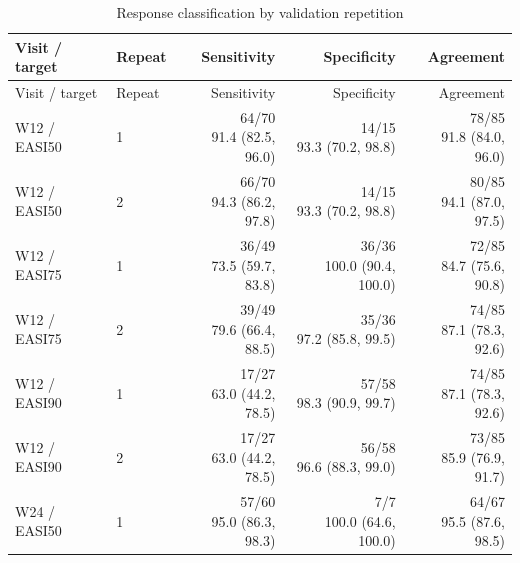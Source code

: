{\small\setlength{\tabcolsep}{4pt}
\begin{longtable}{llrrr}
\caption{Response classification by validation repetition}\label{tab:classification_intervals}\\
\toprule Visit / target & Repeat & Sensitivity & Specificity & Agreement \\ \midrule\endfirsthead
\toprule Visit / target & Repeat & Sensitivity & Specificity & Agreement \\ \midrule\endhead
W12 / EASI50 & 1 & \shortstack{64/70\\91.4 (82.5, 96.0)} & \shortstack{14/15\\93.3 (70.2, 98.8)} & \shortstack{78/85\\91.8 (84.0, 96.0)} \\[4pt]
W12 / EASI50 & 2 & \shortstack{66/70\\94.3 (86.2, 97.8)} & \shortstack{14/15\\93.3 (70.2, 98.8)} & \shortstack{80/85\\94.1 (87.0, 97.5)} \\[4pt]
W12 / EASI75 & 1 & \shortstack{36/49\\73.5 (59.7, 83.8)} & \shortstack{36/36\\100.0 (90.4, 100.0)} & \shortstack{72/85\\84.7 (75.6, 90.8)} \\[4pt]
W12 / EASI75 & 2 & \shortstack{39/49\\79.6 (66.4, 88.5)} & \shortstack{35/36\\97.2 (85.8, 99.5)} & \shortstack{74/85\\87.1 (78.3, 92.6)} \\[4pt]
W12 / EASI90 & 1 & \shortstack{17/27\\63.0 (44.2, 78.5)} & \shortstack{57/58\\98.3 (90.9, 99.7)} & \shortstack{74/85\\87.1 (78.3, 92.6)} \\[4pt]
W12 / EASI90 & 2 & \shortstack{17/27\\63.0 (44.2, 78.5)} & \shortstack{56/58\\96.6 (88.3, 99.0)} & \shortstack{73/85\\85.9 (76.9, 91.7)} \\[4pt]
W24 / EASI50 & 1 & \shortstack{57/60\\95.0 (86.3, 98.3)} & \shortstack{7/7\\100.0 (64.6, 100.0)} & \shortstack{64/67\\95.5 (87.6, 98.5)} \\[4pt]

\end{longtable}}
